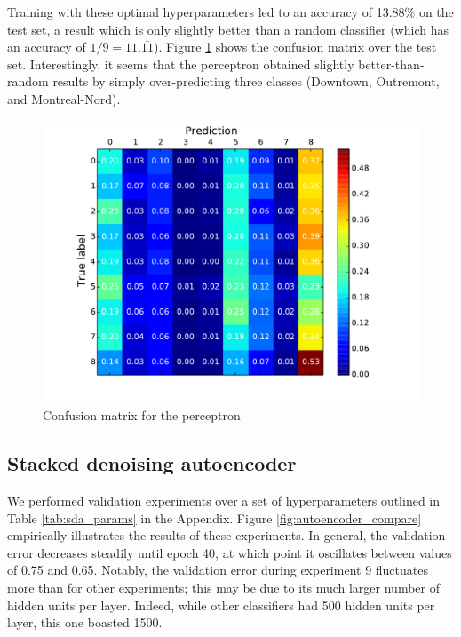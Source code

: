 \documentclass{acm_proc_article-sp}
\begin{document}
Training with these optimal hyperparameters led to an accuracy of 13.88\% on the test set, a result which is only slightly better than a random classifier (which has an accuracy of $1/9 = 11.\bar{11}$). Figure \ref{fig:perceptron-conf} shows the confusion matrix over the test set. Interestingly, it seems that the perceptron obtained slightly better-than-random results by simply over-predicting three classes (Downtown, Outremont, and Montreal-Nord). 
\begin{figure}[h!]
\includegraphics[width=\linewidth]{perceptron_confusion.pdf}
		\caption{Confusion matrix for the perceptron}
		\label{fig:perceptron-conf}
\end{figure}


\subsection{Stacked denoising autoencoder}

We performed validation experiments over a set of hyperparameters outlined in Table \ref{tab:sda_params} in the Appendix. Figure \ref{fig:autoencoder_compare} empirically illustrates the results of these experiments. In general, the validation error decreases steadily until epoch 40, at which point it oscillates between values of 0.75 and 0.65. Notably, the validation error during experiment 9 fluctuates more than for other experiments; this may be due to its much larger number of hidden units per layer. Indeed, while other classifiers had 500 hidden units per layer, this one boasted 1500. 
\end{document}
